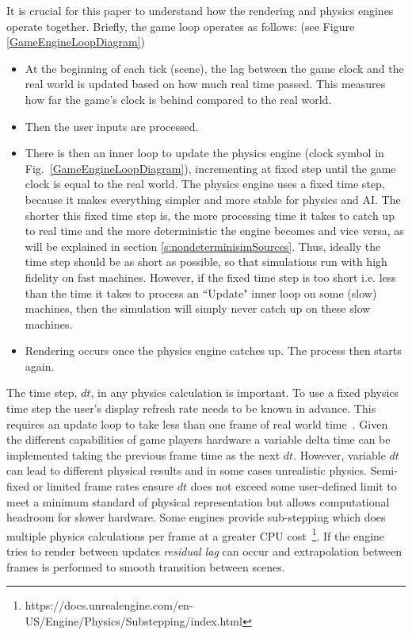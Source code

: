 It is crucial for this paper to understand how the rendering and physics engines operate together. 
Briefly, the game loop operates as follows:\cite{GameProgPatternsBook} (see Figure \ref{GameEngineLoopDiagram})
\begin{itemize}[leftmargin=*]
    \item At the beginning of each tick (scene), the lag between the game clock and the real world is updated based on how much real time passed. This measures how far the game's clock is behind compared to the real world.
    \item Then the user inputs are processed.
    \item There is then an inner loop to update the physics engine (clock symbol in Fig.~\ref{GameEngineLoopDiagram}), incrementing at fixed step until the game clock is equal to the real world. The physics engine uses a fixed time step, because it makes everything simpler and more stable for physics and AI. The shorter this fixed time step is, the more processing time it takes to catch up to real time and the more deterministic the engine becomes and vice versa\cite{GameEngineArchBook}\cite{GameProgPatternsBook}, as will be explained in section \ref{s:nondeterminisimSources}. Thus, ideally the time step should be as short as possible, so that simulations run with high fidelity on fast machines. However, if the fixed time step is too short i.e. less than the time it takes to process an ``Update" inner loop on some (slow) machines, then the simulation will simply never catch up on these slow machines.
    \item Rendering occurs once the physics engine catches up. The process then starts again.
\end{itemize} 



The time step, $dt$, in any physics calculation is important. To use a fixed physics time step the user's display refresh rate needs to be known in advance. This requires an update loop to take less than one frame of real world time~\cite{gaffer}. Given the different capabilities of game players hardware a variable delta time can be implemented taking the previous frame time as the next $dt$. However, variable $dt$ can lead to different physical results and in some cases unrealistic physics. Semi-fixed or limited frame rates ensure $dt$ does not exceed some user-defined limit to meet a minimum standard of physical representation but allows computational headroom for slower hardware. Some engines provide sub-stepping which does multiple physics calculations per frame at a greater CPU cost~\footnote{https://docs.unrealengine.com/en-US/Engine/Physics/Substepping/index.html}. If the engine tries to render between updates \textit{residual lag} can occur \cite{GameEngineArchBook}\cite{GameProgPatternsBook} and extrapolation between frames is performed to smooth transition between scenes.



